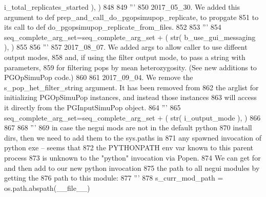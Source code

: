 \begin{DoxyCode}
      i\_total\_replicates\_started ), )
848 
849                     \textcolor{stringliteral}{'''}
850 \textcolor{stringliteral}{                    2017\_05\_30.  We added this argument to def prep\_and\_call\_do\_pgopsimupop\_replicate, to
       propgate}
851 \textcolor{stringliteral}{                    to its call to def do\_pgopsimupop\_replicate\_from\_files.}
852 \textcolor{stringliteral}{                    }
853 \textcolor{stringliteral}{                    '''}
854                     seq\_complete\_arg\_set=seq\_complete\_arg\_set + ( str( b\_use\_gui\_messaging ), )
855 
856                     \textcolor{stringliteral}{'''}
857 \textcolor{stringliteral}{                    2017\_08\_07.  We added args to allow caller to use diffeent output modes, }
858 \textcolor{stringliteral}{                    and, if using the filter output mode, to pass a string with parameters,}
859 \textcolor{stringliteral}{                    for filtering pops by mean heterozygosity.  (See new additions to PGOpSimuPop code.)}
860 \textcolor{stringliteral}{}
861 \textcolor{stringliteral}{                    2017\_09\_04. We remove the s\_pop\_het\_filter\_string argument.  It has been removed from}
862 \textcolor{stringliteral}{                    the arglist for initializing PGOpSimuPop instances, and instead those instances}
863 \textcolor{stringliteral}{                    will access it directly from the PGInputSimuPop object.}
864 \textcolor{stringliteral}{                    '''}
865                     seq\_complete\_arg\_set=seq\_complete\_arg\_set + ( str( i\_output\_mode ), )
866 
867 
868                     \textcolor{stringliteral}{'''}
869 \textcolor{stringliteral}{                    in case the negui mods are not in the default python }
870 \textcolor{stringliteral}{                    install dirs, then we need to add them to the sys.paths in}
871 \textcolor{stringliteral}{                    any  spawned invocation of python exe -- seems that }
872 \textcolor{stringliteral}{                    the PYTHONPATH env var known to this parent process }
873 \textcolor{stringliteral}{                    is unknown to the "python" invocation via Popen.  }
874 \textcolor{stringliteral}{                    We can get for and then add to our new python invocation}
875 \textcolor{stringliteral}{                    the path to all negui modules by getting the}
876 \textcolor{stringliteral}{                    path to this module:}
877 \textcolor{stringliteral}{                    '''}
878                     s\_curr\_mod\_path = os.path.abspath(\_\_file\_\_)

\end{DoxyCode}
